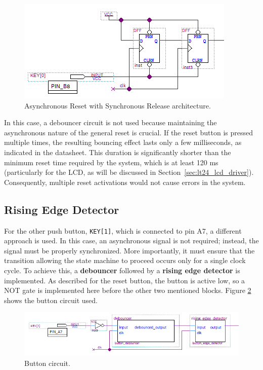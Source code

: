 \documentclass[11pt]{report}
\begin{document}
\begin{figure}[!h]
    \centering
    \includegraphics[width=0.8\linewidth]{images/controller/reset_circuit.png}
    \caption{Asynchronous Reset with Synchronous Release architecture.}
    \label{fig:reset_architecture}
\end{figure}

In this case, a debouncer circuit is not used because maintaining the asynchronous nature of the general reset is crucial. If the reset button is pressed multiple times, the resulting bouncing effect lasts only a few milliseconds, as indicated in the datasheet. This duration is significantly shorter than the minimum reset time required by the system, which is at least 120 ms (particularly for the LCD, as will be discussed in Section~\ref{sec:lt24_lcd_driver}). Consequently, multiple reset activations would not cause errors in the system.

\subsection{Rising Edge Detector} 

For the other push button, \texttt{KEY[1]}, which is connected to pin A7, a different approach is used. In this case, an asynchronous signal is not required; instead, the signal must be properly synchronized. More importantly, it must ensure that the transition allowing the state machine to proceed occurs only for a single clock cycle. To achieve this, a \textbf{debouncer} followed by a \textbf{rising edge detector} is implemented. As described for the reset button, the button is active low, so a NOT gate is implemented here before the other two mentioned blocks. Figure \ref{fig:button_circuit} shows the button circuit used.

\begin{figure}[!h]
    \centering
    \includegraphics[width=0.8\linewidth]{images/controller/button_circuit.png}
    \caption{Button circuit.}
    \label{fig:button_circuit}
\end{figure}
\end{document}
